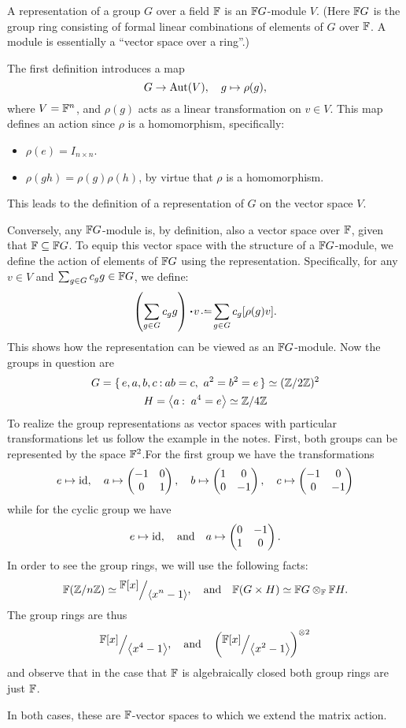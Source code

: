 \documentclass[12pt]{memoir}
\begin{document}
\begin{Def}
A representation of a group $G$ over a field $\mathbb{F}$ is an $\mathbb{F} G$-module $V$. (Here $\mathbb{F} G$ is the group ring consisting of formal linear combinations of elements of $G$ over $\mathbb{F}$. A module is essentially a ``vector space over a ring''.)
\end{Def}
\begin{ptcbr}
    The first definition introduces a map 
    $$G \to \operatorname{Aut}(V), \quad g \mapsto \rho(g),$$
    where $V = \mathbb{F}^n$, and $\rho(g)$ acts as a linear transformation on $v \in V$. This map defines an action since $\rho$ is a homomorphism, specifically:
    \begin{itemize}
        \item $\rho(e) = I_{n \times n}$.
        \item $\rho(gh) = \rho(g)\rho(h)$, by virtue that $\rho$ is a homomorphism.
    \end{itemize}
    This leads to the definition of a representation of $G$ on the vector space $V$.\par 
    Conversely, any $\mathbb{F} G$-module is, by definition, also a vector space over $\mathbb{F}$, given that $\mathbb{F} \subseteq \mathbb{F} G$. To equip this vector space with the structure of a $\mathbb{F} G$-module, we define the action of elements of $\mathbb{F} G$ using the representation. Specifically, for any $v \in V$ and $\sum_{g \in G} c_g g \in \mathbb{F} G$, we define:
    $$\left(\sum_{g \in G} c_g g\right) \. v \defeq \sum_{g \in G} c_g [\rho(g)v].$$
    This shows how the representation can be viewed as an $\mathbb{F} G$-module.
    \tcblower %
    Now the groups in question are 
    \begin{gather*}
        G=\{\,e,a,b,c\mathbin{:} ab=c,\ a^2=b^2=e\,\}\simeq(\mathbb{Z}/2\mathbb{Z})^2\\
        H=\left\langle a\mathbin{:}\ a^4=e\right\rangle\simeq\mathbb{Z}/4\mathbb{Z}
    \end{gather*}
  To realize the group representations as vector spaces with particular transformations let us follow the example in the notes. First, both groups can be represented by the space $\mathbb{F}^2$.For the first group we have the transformations
  $$e\mapsto\operatorname{id},\quad a\mapsto \begin{pmatrix} -1 & 0 \\ 0 & 1 \end{pmatrix},\quad b\mapsto \begin{pmatrix} 1 & 0 \\ 0 & -1 \end{pmatrix},\quad c\mapsto \begin{pmatrix} -1 & 0 \\ 0 & -1 \end{pmatrix}$$ 
  while for the cyclic group we have 
  $$e\mapsto \operatorname{id},\quad\text{and}\quad a\mapsto \begin{pmatrix} 0 & -1 \\ 1 & 0 \end{pmatrix}.$$
  In order to see the group rings, we will use the following facts:
  $$\bF(\bZ/n\bZ)\isom \quot{\bF[x]}{\genr{x^n-1}},\word{and}\bF(G\x H)\isom \bF G\ox_\bF\bF H.$$
    The group rings are thus 
    $$\quot{\bF[x]}{\genr{x^4-1}},\word{and}\left(\quot{\bF[x]}{\genr{x^2-1}}\right)^{\ox 2}$$
    and observe that in the case that $\mathbb{F}$ is algebraically closed both group rings are just $\mathbb{F}$.\par 
    In both cases, these are $\mathbb{F}$-vector spaces to which we extend the matrix action.
    \end{ptcbr}
\end{document}
